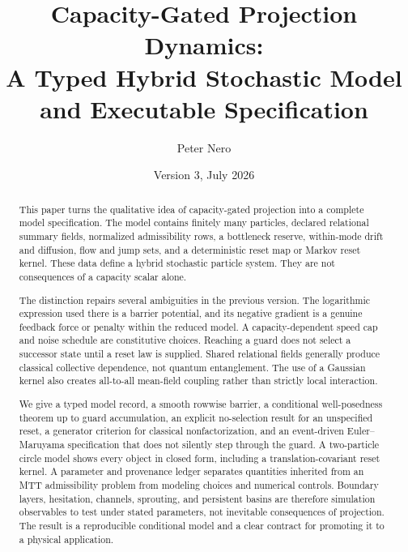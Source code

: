 \documentclass[11pt]{article}
\title{\vspace{-1em}
Capacity-Gated Projection Dynamics:\\[0.25em]
\large A Typed Hybrid Stochastic Model and Executable Specification}
\author{Peter Nero}
\date{Version 3, July 2026}
\theoremstyle{definition}
\theoremstyle{remark}
\begin{document}
\maketitle

\begin{abstract}
This paper turns the qualitative idea of capacity-gated projection into a
complete model specification.  The model contains finitely many particles,
declared relational summary fields, normalized admissibility rows, a
bottleneck reserve, within-mode drift and diffusion, flow and jump sets,
and a deterministic reset map or Markov reset kernel.  These data define a
hybrid stochastic particle system.  They are not consequences of a capacity
scalar alone.

The distinction repairs several ambiguities in the previous version.
The logarithmic expression used there is a barrier potential, and its
negative gradient is a genuine feedback force or penalty within the reduced
model.  A capacity-dependent speed cap and noise schedule are constitutive
choices.  Reaching a guard does not select a successor state until a reset
law is supplied.  Shared relational fields generally produce classical
collective dependence, not quantum entanglement.  The use of a Gaussian
kernel also creates all-to-all mean-field coupling rather than strictly
local interaction.

We give a typed model record, a smooth rowwise barrier, a conditional
well-posedness theorem up to guard accumulation, an explicit no-selection
result for an unspecified reset, a generator criterion for classical
nonfactorization, and an event-driven Euler--Maruyama specification that
does not silently step through the guard.  A two-particle circle model
shows every object in closed form, including a translation-covariant reset
kernel.  A parameter and provenance ledger separates quantities inherited
from an MTT admissibility problem from modeling choices and numerical
controls.  Boundary layers, hesitation, channels, sprouting, and persistent
basins are therefore simulation observables to test under stated
parameters, not inevitable consequences of projection.  The result is a
reproducible conditional model and a clear contract for promoting it to a
physical application.
\end{abstract}
\end{document}

